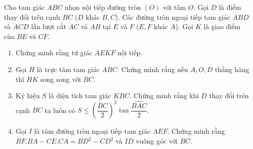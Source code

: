 \begin{ex}%
   Cho tam giác $ABC$ nhọn nội tiếp đường tròn $(O)$ với tâm $O$. Gọi $D$ là điểm thay đổi trên cạnh $BC$ ($D$ khác $B, C$). Các đường tròn ngoại tiếp tam giác $ABD$ và $ACD$ lần lượt cắt $AC$ và $AB$ tại $E$ và $F$ ($E, F$ khác $A$). Gọi $K$ là giao điểm của $BE$ và $CF$.
    \begin{enumerate}
        \item Chứng minh rằng tứ giác $AEKF$ nội tiếp.
        \item Gọi $H$ là trực tâm tam giác $ABC$. Chứng minh rằng nếu $A, O, D$ thẳng hàng thì $HK$ song song với $BC$.
        \item Ký hiệu $S$ là diện tích tam giác $KBC$. Chứng minh rằng khi $D$ thay đổi trên cạnh $BC$ ta luôn có $S \le \left( \dfrac{BC}{2} \right)^2 \tan{\dfrac{\widehat{BAC}}{2}}$.
        \item Gọi $I$ là tâm đường tròn ngoại tiếp tam giác $AEF$. Chứng minh rằng $BF. BA-CE.CA=BD^2-CD^2$
và $ID$ vuông góc với $BC$.
    \end{enumerate}
\loigiai
    {
\begin{center}
\end{center}}
\end{ex}
